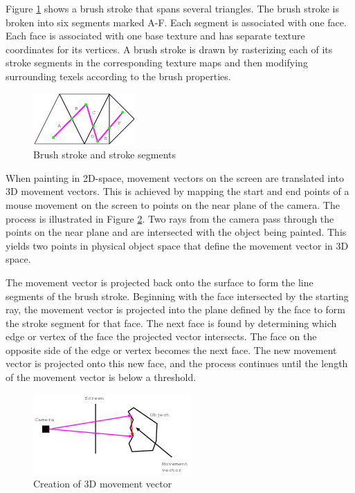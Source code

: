 \documentclass[10pt,twocolumn]{article}
\begin{document}
Figure \ref{BrushStroke1} shows a brush stroke that spans several triangles.
The brush stroke is broken into six segments marked A-F. 
Each segment is associated with one face. Each face is associated
with one base texture and has separate texture coordinates for its vertices.
A brush stroke is drawn by rasterizing each of its stroke segments in the corresponding 
texture maps and then modifying surrounding texels according to the brush properties.  

\begin{figure}
\begin{center}
\includegraphics{BrushStroke1.png}
\caption{Brush stroke and stroke segments}
\label{BrushStroke1}
\end{center}
\end{figure}

When painting in 2D-space, movement vectors on the screen are
translated into 3D movement vectors. 
This is achieved by mapping the start and end points of a mouse movement
on the screen to points on the near plane of the camera.
The process is illustrated in Figure \ref{2Dto3DMovementVector}.
Two rays from the camera pass through the points on the near plane
and are intersected with the object being painted.
This yields two points in physical object space that define the movement
vector in 3D space.  

The movement vector is projected back onto the surface to form the line segments of the brush stroke.
Beginning with the face intersected by the starting ray, the movement vector is projected
into the plane defined by the face to form the stroke segment for that face.  
The next face is found by determining which edge or vertex 
of the face the projected vector intersects. 
The face on the opposite  side of the edge or vertex becomes the next face.
The new movement vector is projected onto this new face, and the process continues until
the length of the movement vector is below a threshold.
 
\begin{figure}
\begin{center}
\includegraphics{2Dto3DMovementVector.png}
\caption{Creation of 3D movement vector}
\label{2Dto3DMovementVector}
\end{center}
\end{figure}
\end{document}
